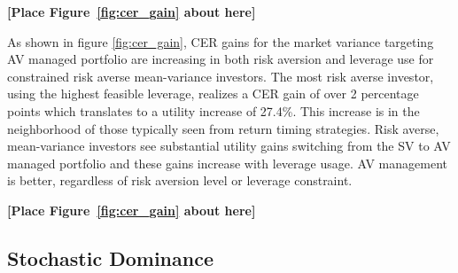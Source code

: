 \bigskip
\centerline{\bf [Place Figure~\ref{fig:cer_gain} about here]}
\bigskip

As shown in figure \ref{fig:cer_gain}, CER gains for the market variance targeting AV managed portfolio are increasing in both risk aversion and leverage use for constrained risk averse mean-variance investors. %
The most risk averse investor, using the highest feasible leverage, realizes a CER gain of over 2 percentage points which translates to a utility increase of 27.4\%. This increase is in the neighborhood of those typically seen from return timing strategies. \citep{campbell1997econometrics,moreira_volatility-managed_2017} Risk averse, mean-variance investors see substantial utility gains switching from the SV to AV managed portfolio and these gains increase with leverage usage. AV management is better, regardless of risk aversion level or leverage constraint.

\bigskip
\centerline{\bf [Place Figure~\ref{fig:cer_gain} about here]}
\bigskip

\subsection{Stochastic Dominance} \label{sec:stoc_dom}


